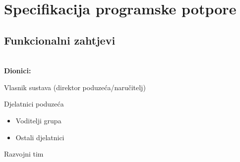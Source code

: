\chapter{Specifikacija programske potpore}
		
	\section{Funkcionalni zahtjevi}
			
			
			\noindent \textbf{\\Dionici:}
			
			\begin{packed_enum}
				\item Vlasnik sustava (direktor poduzeća/naručitelj)
				\item Djelatnici poduzeća
				\begin{itemize}
					\item Voditelji grupa
					\item Ostali djelatnici
				\end{itemize}
				\item Razvojni tim
			\end{packed_enum}
			
